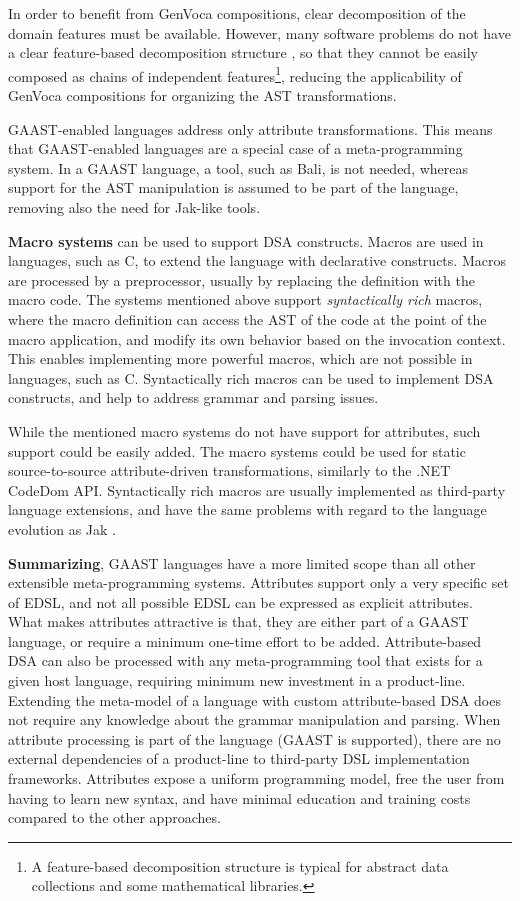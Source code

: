 In order to benefit from GenVoca compositions, clear decomposition of the domain features must be available. However, many software problems do not have a clear feature-based decomposition structure \cite{foa-aop.04}, so that they cannot be easily composed as chains of independent features\footnote{A feature-based decomposition structure is typical for abstract data collections and some mathematical libraries.}, reducing the applicability of GenVoca compositions for organizing the AST transformations.

GAAST-enabled languages address only attribute transformations. This means that GAAST-enabled languages are a special case of a meta-programming system. In a GAAST language, a tool, such as Bali, is not needed, whereas support for the AST manipulation is assumed to be part of the language, removing also the need for Jak-like tools.

\noindent \textbf{Macro systems} \cite{java.jse,java.epp,java.maya} can be used to support DSA constructs. Macros are used in languages, such as C, to extend the language with declarative constructs. Macros are processed by a preprocessor, usually by replacing the definition with the macro code. The systems mentioned above support \textit{syntactically rich} macros, where the macro definition can access the AST of the code at the point of the macro application, and modify its own behavior based on the invocation context. This enables implementing more powerful macros, which are not possible in languages, such as C. Syntactically rich macros can be used to implement DSA constructs, and help to address grammar and parsing issues.

While the mentioned macro systems do not have support for attributes, such support could be easily added. The macro systems could be used for static source-to-source attribute-driven transformations, similarly to the .NET CodeDom API. Syntactically rich macros are usually implemented as third-party language extensions, and have the same problems with regard to the language evolution as Jak \cite{batory98jts}.

\textbf{Summarizing}, GAAST languages have a more limited scope than all other extensible meta-programming systems. Attributes support only a very specific set of EDSL, and not all possible EDSL can be expressed as explicit attributes. What makes attributes attractive is that, they are either part of a GAAST language, or require a minimum one-time effort to be added. Attribute-based DSA can also be processed with any meta-programming tool that exists for a given host language, requiring minimum new investment in a product-line. Extending the meta-model of a language with custom attribute-based DSA does not require any knowledge about the grammar manipulation and parsing. When attribute processing is part of the language (GAAST is supported), there are no external dependencies of a product-line to third-party DSL implementation frameworks. Attributes expose a uniform programming model, free the user from having to learn new syntax, and have minimal education and training costs compared to the other approaches. 

